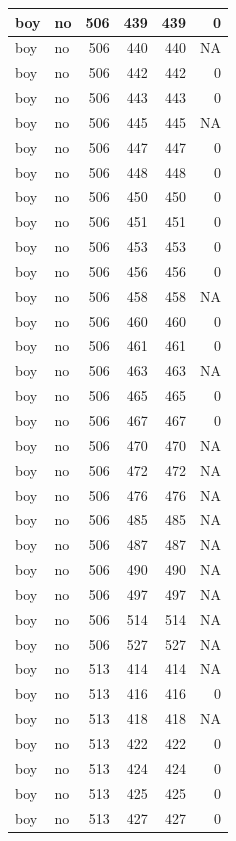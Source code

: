 \documentclass[man]{apa6}
\begin{document}
\begin{tabular}{l|l|r|r|r|r}
\hline
boy & no & 506 & 439 & 439 & 0\\
\hline
boy & no & 506 & 440 & 440 & NA\\
\hline
boy & no & 506 & 442 & 442 & 0\\
\hline
boy & no & 506 & 443 & 443 & 0\\
\hline
boy & no & 506 & 445 & 445 & NA\\
\hline
boy & no & 506 & 447 & 447 & 0\\
\hline
boy & no & 506 & 448 & 448 & 0\\
\hline
boy & no & 506 & 450 & 450 & 0\\
\hline
boy & no & 506 & 451 & 451 & 0\\
\hline
boy & no & 506 & 453 & 453 & 0\\
\hline
boy & no & 506 & 456 & 456 & 0\\
\hline
boy & no & 506 & 458 & 458 & NA\\
\hline
boy & no & 506 & 460 & 460 & 0\\
\hline
boy & no & 506 & 461 & 461 & 0\\
\hline
boy & no & 506 & 463 & 463 & NA\\
\hline
boy & no & 506 & 465 & 465 & 0\\
\hline
boy & no & 506 & 467 & 467 & 0\\
\hline
boy & no & 506 & 470 & 470 & NA\\
\hline
boy & no & 506 & 472 & 472 & NA\\
\hline
boy & no & 506 & 476 & 476 & NA\\
\hline
boy & no & 506 & 485 & 485 & NA\\
\hline
boy & no & 506 & 487 & 487 & NA\\
\hline
boy & no & 506 & 490 & 490 & NA\\
\hline
boy & no & 506 & 497 & 497 & NA\\
\hline
boy & no & 506 & 514 & 514 & NA\\
\hline
boy & no & 506 & 527 & 527 & NA\\
\hline
boy & no & 513 & 414 & 414 & NA\\
\hline
boy & no & 513 & 416 & 416 & 0\\
\hline
boy & no & 513 & 418 & 418 & NA\\
\hline
boy & no & 513 & 422 & 422 & 0\\
\hline
boy & no & 513 & 424 & 424 & 0\\
\hline
boy & no & 513 & 425 & 425 & 0\\
\hline
boy & no & 513 & 427 & 427 & 0\\

\end{tabular}
\end{document}
